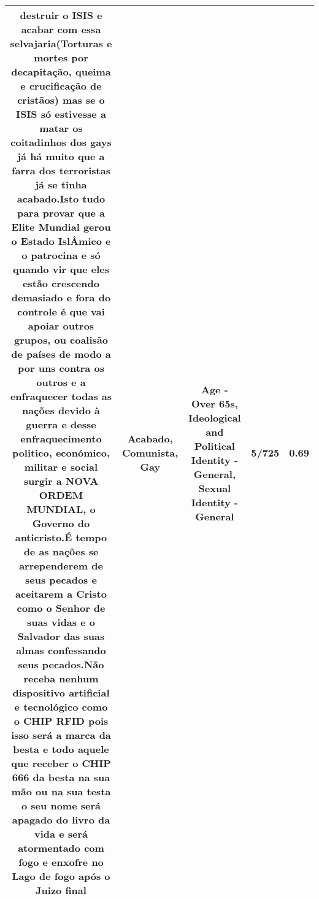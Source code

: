 \documentclass[11pt]{article}
\newlength\mylength
\begin{document}
\begin{center}
\begin{longtable}{|C{.65\mylength}|C{.30\mylength}|C{.12\mylength}|C{.12\mylength}|C{.12\mylength}|}
destruir o ISIS e acabar com essa selvajaria(Torturas e mortes por decapitação, queima e crucificação de cristãos) mas se o ISIS só estivesse a matar os coitadinhos dos gays já há muito que a farra dos terroristas já se tinha \textbf{acabado}.Isto tudo para provar que a Elite Mundial gerou o Estado IslÂmico e o patrocina e só quando vir que eles estão crescendo demasiado e fora do controle é que vai apoiar outros grupos, ou coalisão de países de modo a por uns contra os outros e a enfraquecer todas as nações devido à guerra e desse enfraquecimento politico, económico, militar e social surgir a NOVA ORDEM MUNDIAL, o Governo do anticristo.É tempo de as nações se arrependerem de seus pecados e aceitarem a Cristo como o Senhor de suas vidas e o Salvador das suas almas confessando seus pecados.Não receba nenhum dispositivo artificial e tecnológico como o CHIP RFID pois isso será a marca da besta e todo aquele que receber o CHIP 666 da besta na sua mão ou na sua testa o seu nome será apagado do livro da vida e será atormentado com fogo e enxofre no Lago de fogo após o Juizo final\normalsize   & Acabado, Comunista, Gay & Age - Over 65s, Ideological and Political Identity - General, Sexual Identity - General & 5/725 & 0.69 \\  \hline

\end{longtable}
\end{center}
\end{document}
